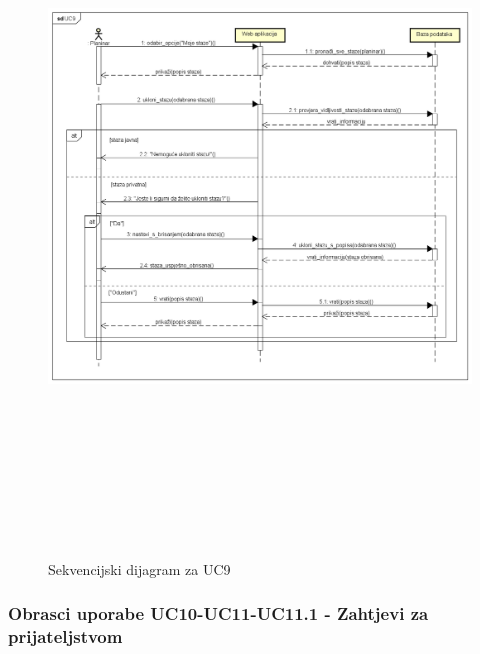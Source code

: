 				\begin{figure}[H]
					\includegraphics[scale=1.5, width=165mm, height=190mm]{dijagrami/seq-UC9.png} %
					\centering
					\caption{Sekvencijski dijagram za UC9}
					\label{fig:sekvencijski dijagrami}
				\end{figure}
				\newpage
				\subsubsection{Obrasci uporabe UC10-UC11-UC11.1 - Zahtjevi za prijateljstvom}

